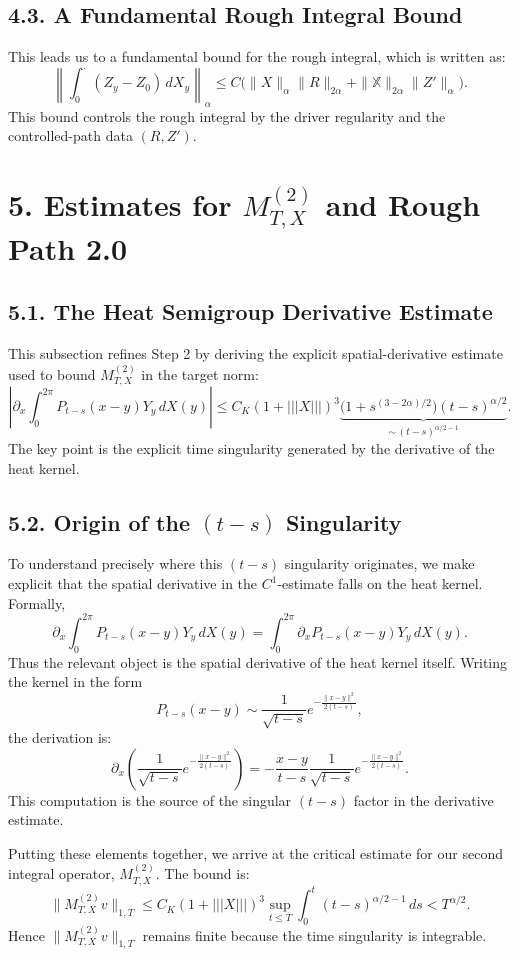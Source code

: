 \documentclass[11pt]{article}
\theoremstyle{definition}
\theoremstyle{remark}
\begin{document}
\subsection*{4.3. A Fundamental Rough Integral Bound}
This leads us to a fundamental bound for the rough integral, which is written as:
\[
\left\|\int_0^\cdot (Z_y-Z_0)\,dX_y\right\|_{\alpha}
\le C\bigl(\|X\|_{\alpha}\|R\|_{2\alpha}+\|\mathbb X\|_{2\alpha}\|Z'\|_{\alpha}\bigr).
\]
This bound controls the rough integral by the driver regularity and the controlled-path data $(R,Z')$.

\section*{5. Estimates for $M_{T,X}^{(2)}$ and Rough Path 2.0}
\subsection*{5.1. The Heat Semigroup Derivative Estimate}
This subsection refines Step 2 by deriving the explicit spatial-derivative estimate used to bound $M_{T,X}^{(2)}$ in the target norm:
\[
\left|\partial_x\int_0^{2\pi} P_{t-s}(x-y)Y_y\,dX(y)\right|
\le C_K(1+|||X|||)^3\underbrace{\bigl(1+s^{(3-2\alpha)/2}\bigr)(t-s)^{\alpha/2}}_{\sim\,(t-s)^{\alpha/2-1}}.
\]
The key point is the explicit time singularity generated by the derivative of the heat kernel.

\subsection*{5.2. Origin of the $(t-s)$ Singularity}
To understand precisely where this $(t-s)$ singularity originates, we make explicit that the spatial derivative in the $C^1$-estimate falls on the heat kernel. Formally,
\[
\partial_x\int_0^{2\pi} P_{t-s}(x-y)Y_y\,dX(y)
=
\int_0^{2\pi} \partial_x P_{t-s}(x-y)Y_y\,dX(y).
\]
Thus the relevant object is the spatial derivative of the heat kernel itself. Writing the kernel in the form
\[
P_{t-s}(x-y)\sim \frac{1}{\sqrt{t-s}}e^{-\frac{\|x-y\|^2}{2(t-s)}},
\]
the derivation is:
\[
\partial_x\!\left(\frac{1}{\sqrt{t-s}}e^{-\frac{\|x-y\|^2}{2(t-s)}}\right)
=-\frac{x-y}{t-s}\frac{1}{\sqrt{t-s}}e^{-\frac{\|x-y\|^2}{2(t-s)}}.
\]
This computation is the source of the singular $(t-s)$ factor in the derivative estimate.

Putting these elements together, we arrive at the critical estimate for our second integral operator, $M_{T,X}^{(2)}$. The bound is:
\[
\|M_{T,X}^{(2)}v\|_{1,T}
\le C_K(1+|||X|||)^3
\sup_{t\le T}\int_0^t (t-s)^{\alpha/2-1}\,ds
< T^{\alpha/2}.
\]
Hence $\|M_{T,X}^{(2)}v\|_{1,T}$ remains finite because the time singularity is integrable.
\end{document}
